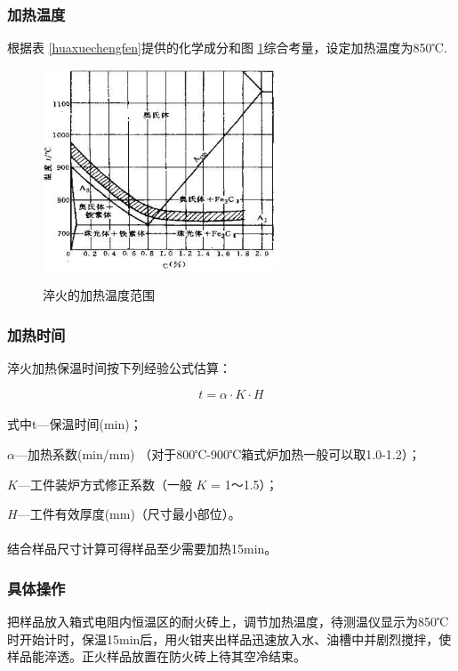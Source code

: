 \documentclass[12pt]{ctexart}
\begin{document}
\subsubsection{加热温度}
根据表 \ref{huaxuechengfen}提供的化学成分和图 \ref{cuihuowendu}综合考量，设定加热温度为850℃.
\newpage
\begin{figure}[h]
  \centering
  \includegraphics[width=7cm]{cuihuowendu.jpg}\\
  \caption{淬火的加热温度范围}\label{cuihuowendu}
\end{figure}

\subsubsection{加热时间}
淬火加热保温时间按下列经验公式估算：

\[t = \alpha  \cdot K \cdot H\]

\paragraph{}
式中t—保温时间(min)；

    $\alpha$—加热系数(min/mm) （对于800℃-900℃箱式炉加热一般可以取1.0-1.2）；

    $K$—工件装炉方式修正系数（一般 $K$ = 1～1.5）；

    $H$—工件有效厚度(mm)（尺寸最小部位）。
\paragraph{}
结合样品尺寸计算可得样品至少需要加热15min。
\subsubsection{具体操作}
把样品放入箱式电阻内恒温区的耐火砖上，调节加热温度，待测温仪显示为850℃时开始计时，保温15min后，用火钳夹出样品迅速放入水、油槽中并剧烈搅拌，使样品能淬透。正火样品放置在防火砖上待其空冷结束。
\end{document}
